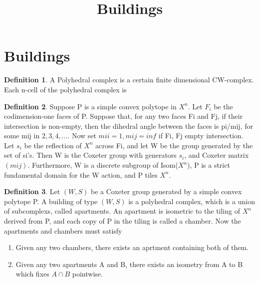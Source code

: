 \documentclass[11pt]{article}
\begin{document}
\newtheorem{theorem}{Theorem}
\theoremstyle{definition}
\newtheorem{definition}{Definition}
\newtheorem{proposition}{Proposition}
\newtheorem{example}{Example}
\newtheorem{lemma}{Lemma}
\newtheorem{corollary}{Corollary}
\newcommand{\uw}{\mathcal{U}(W,X)}
\newcommand{\W}{$(W,S)$}
\newcommand{\ix}{\textit}
\newcommand{\tr}{\textcolor{red}}
\newcommand{\sg}{$\Sigma$}


\title{Buildings}
\maketitle
\tableofcontents 

\section{Buildings}
\begin{definition}
  A Polyhedral complex is a certain finite dimensional CW-complex. Each n-cell of the polyhedral complex is   
\end{definition}

\begin{definition}
    Suppose P is a simple convex polytope in $X^n$. Let $F_i$ be the codimension-one faces of P. Suppose that, for any two faces Fi and Fj, if their intersection is non-empty, then the dihedral angle between the faces is pi/mij, for some mij in ${2,3,4,...}$. Now set $mii=1, mij=inf$ if Fi, Fj empty intersection. Let $s_i$ be the reflection of $X^n$ across Fi, and let W be the group generated by the set of si's. Then W is the Coxeter group with generators $s_i$, and Coxeter matrix $(mij)$. Furthermore, W is a discrete subgroup of Isom($X^n$), P is a strict fundamental domain for the W action, and P tiles $X^n$. 
\end{definition}   
    
\begin{definition}
    Let $(W,S)$ be a Coxeter group generated by a simple convex polytope P. A building of type $(W,S)$ is a polyhedral complex, which is a union of subcomplexs, called apartments. An apartment is isometric to the tiling of $X^n$ derived from P, and each copy of P in the tiling is called a chamber. Now the apartments and chambers must satisfy
    \begin{enumerate}
    \item Given any two chambers, there exists an aprtment containing both of them.
    \item Given any two apartments A and B, there exists an isometry from A to B which fixes $A \cap B$ pointwise. 
    \end{enumerate}
\end{definition}
\end{document}
